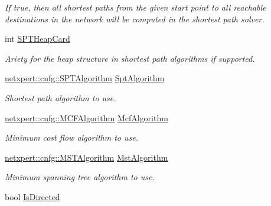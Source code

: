 \begin{DoxyCompactItemize}
\begin{DoxyCompactList}\small\item\em If true, then all shortest paths from the given start point to all reachable destinations in the network will be computed in the shortest path solver. \end{DoxyCompactList}\item 
int \hyperlink{structnetxpert_1_1cnfg_1_1Config_a41afc9fb4f15155eec2f8c30eaae5500}{S\+P\+T\+Heap\+Card}
\begin{DoxyCompactList}\small\item\em Ariety for the heap structure in shortest path algorithms if supported. \end{DoxyCompactList}\item 
\hyperlink{namespacenetxpert_1_1cnfg_a6ff755ed7f76e0049e3eeeed86c9b55d}{netxpert\+::cnfg\+::\+S\+P\+T\+Algorithm} \hyperlink{structnetxpert_1_1cnfg_1_1Config_a207a8bc8efda8c4c67a256a13ed54e05}{Spt\+Algorithm}\hypertarget{structnetxpert_1_1cnfg_1_1Config_a207a8bc8efda8c4c67a256a13ed54e05}{}\label{structnetxpert_1_1cnfg_1_1Config_a207a8bc8efda8c4c67a256a13ed54e05}

\begin{DoxyCompactList}\small\item\em Shortest path algorithm to use. \end{DoxyCompactList}\item 
\hyperlink{namespacenetxpert_1_1cnfg_aae922390a89b0c9af1bc2532428c5ef9}{netxpert\+::cnfg\+::\+M\+C\+F\+Algorithm} \hyperlink{structnetxpert_1_1cnfg_1_1Config_af33b0b153b4682b2cff31be437acd0c1}{Mcf\+Algorithm}\hypertarget{structnetxpert_1_1cnfg_1_1Config_af33b0b153b4682b2cff31be437acd0c1}{}\label{structnetxpert_1_1cnfg_1_1Config_af33b0b153b4682b2cff31be437acd0c1}

\begin{DoxyCompactList}\small\item\em Minimum cost flow algorithm to use. \end{DoxyCompactList}\item 
\hyperlink{namespacenetxpert_1_1cnfg_ab77ff30f2da32945dbb19bdf6199f799}{netxpert\+::cnfg\+::\+M\+S\+T\+Algorithm} \hyperlink{structnetxpert_1_1cnfg_1_1Config_a7d4b58830190d9c7d79b23a61625bd44}{Mst\+Algorithm}\hypertarget{structnetxpert_1_1cnfg_1_1Config_a7d4b58830190d9c7d79b23a61625bd44}{}\label{structnetxpert_1_1cnfg_1_1Config_a7d4b58830190d9c7d79b23a61625bd44}

\begin{DoxyCompactList}\small\item\em Minimum spanning tree algorithm to use. \end{DoxyCompactList}\item 
bool \hyperlink{structnetxpert_1_1cnfg_1_1Config_a732e585e5f3cf8e04c7b230fd0b9aaf5}{Is\+Directed}\hypertarget{structnetxpert_1_1cnfg_1_1Config_a732e585e5f3cf8e04c7b230fd0b9aaf5}{}\label{structnetxpert_1_1cnfg_1_1Config_a732e585e5f3cf8e04c7b230fd0b9aaf5}


\end{DoxyCompactItemize}
